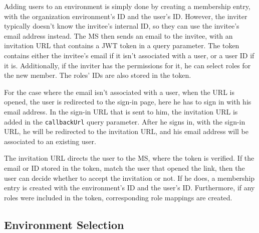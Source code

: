 Adding users to an environment is simply done by creating a membership entry, with the
organization environment's ID and the user's ID.
However, the inviter typically doesn't know the invitee's internal ID,
so they can use the invitee's email address instead.
The MS then sends an email to the invitee, with an invitation URL that contains a JWT
token in a query parameter.
The token contains either the invitee's email if it isn't associated with a user, or a
user ID if it is.
Additionally, if the inviter has the permissions for it, he can select roles for the new member.
The roles' IDs are also stored in the token.

For the case where the email isn't associated with a user, when the URL is opened, the
user is redirected to the sign-in page, here he has to sign in with his email address.
In the sign-in URL that is sent to him, the invitation URL is added in the
\lstinline{callbackUrl} query parameter.
After he signs in, with the sign-in URL, he will be redirected to the invitation URL, and
his email address will be associated to an existing user.

The invitation URL directs the user to the MS, where the token is verified.
If the email or ID stored in the token, match the user that opened the link, then the user
can decide whether to accept the invitation or not.
If he does, a membership entry is created with the environment's ID and the user's ID.
Furthermore, if any roles were included in the token, corresponding role mappings are created.



\subsection{Environment Selection}

